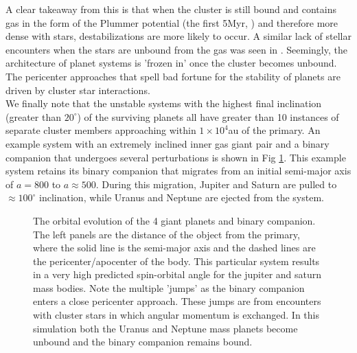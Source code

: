 \documentclass{aastex631}
\begin{document}
A clear takeaway from this is that when the cluster is still bound and contains gas 
in the form of the Plummer potential (the first 5Myr, \cite{all07}) and therefore more dense with stars, destabilizations are more likely to occur. A similar
lack of stellar encounters when the stars are unbound from the gas was seen in \cite{ada06}.
Seemingly, the architecture of planet systems is 'frozen in' once the cluster becomes unbound. The pericenter approaches 
that spell bad fortune for the stability of planets are driven by cluster star interactions. \\
\indent We finally note that the unstable systems with the highest final inclination (greater than $20^{\circ}$) of the surviving planets
all have greater than 10 instances of separate cluster members approaching within $1\times 10^4$au of the primary. An example system with an extremely inclined
inner gas giant pair and a binary companion that undergoes several perturbations is shown in Fig \ref{fig:stepbinary}. This example system retains its binary companion that
migrates from an initial semi-major axis of $a=800$ to $a\approx 500$.
During this migration, Jupiter and Saturn are pulled to $\approx 100^{\circ}$ inclination, while Uranus and Neptune are ejected from the system.

\begin{figure}
    \caption{The orbital evolution of the 4 giant planets and binary companion. The left panels are the distance of the object from the primary,
    where the solid line is the semi-major axis and the dashed lines are the pericenter/apocenter of the body. This particular system results in a very high
    predicted spin-orbital angle for the jupiter and saturn mass bodies. Note the multiple 'jumps' as the binary companion 
    enters a close pericenter approach. These jumps are from encounters with cluster stars in which angular momentum is exchanged. In this
    simulation both the Uranus and Neptune mass planets become unbound and the binary companion remains bound.}
    \label{fig:stepbinary}
\end{figure}
\end{document}
